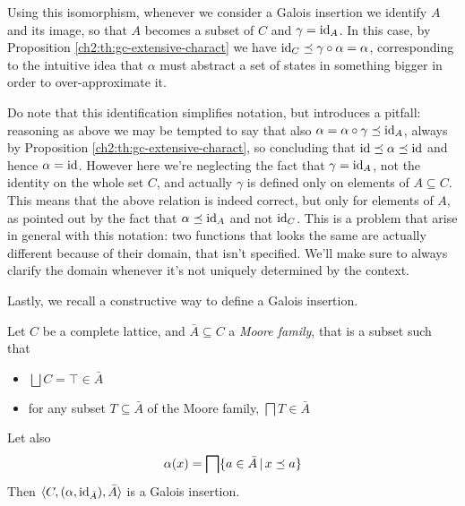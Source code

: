 Using this isomorphism, whenever we consider a Galois insertion we identify $A$ and its image, so that $A$ becomes a subset of $C$ and $\gamma = \text{id}_A$. In this case, by Proposition \ref{ch2:th:gc-extensive-charact} we have $\text{id}_C \preceq \gamma \circ \alpha = \alpha$, corresponding to the intuitive idea that $\alpha$ must abstract a set of states in something bigger in order to over-approximate it.

Do note that this identification simplifies notation, but introduces a pitfall: reasoning as above we may be tempted to say that also $\alpha = \alpha \circ \gamma \preceq \text{id}_A$, always by Proposition \ref{ch2:th:gc-extensive-charact}, so concluding that $\text{id} \preceq \alpha \preceq \text{id}$ and hence $\alpha = \text{id}$. However here we're neglecting the fact that $\gamma = \text{id}_A$, not the identity on the whole set $C$, and actually $\gamma$ is defined only on elements of $A \subseteq C$. This means that the above relation is indeed correct, but only for elements of $A$, as pointed out by the fact that $\alpha \preceq \text{id}_A$ and not $\text{id}_C$. This is a problem that arise in general with this notation: two functions that looks the same are actually different because of their domain, that isn't specified. We'll make sure to always clarify the domain whenever it's not uniquely determined by the context.

Lastly, we recall a constructive way to define a Galois insertion.
\begin{prop}\label{ch2:th:gi-moore-family}
	Let $C$ be a complete lattice, and $\bar{A} \subseteq C$ a \textit{Moore family}, that is a subset such that
	\begin{itemize}
		\item $\bigsqcup C = \top \in \bar{A}$
		\item for any subset $T \subseteq \bar{A}$ of the Moore family, $\bigsqcap T \in \bar{A}$
	\end{itemize}
	Let also
	\[
	\alpha(x) = \bigsqcap \{ a \in \bar{A} \,\vert\, x \preceq a \}
	\]
	Then $\langle C, (\alpha, \text{id}_{\bar{A}}), \bar{A} \rangle$ is a Galois insertion.
\end{prop}

